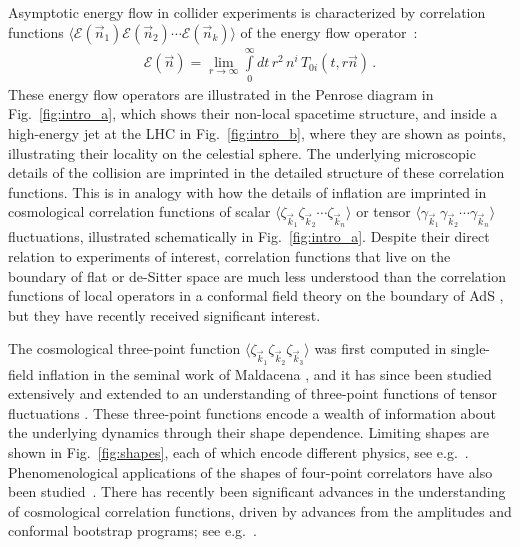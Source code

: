 \documentclass[letterpaper,11pt]{article}
\def\Fig#1{Fig.~{\ref{#1}}}
\def\to{\rightarrow}
\DeclareRobustCommand{\Fig}[1]{Fig.~\ref{#1}}
\begin{document}
Asymptotic energy flow in collider experiments is characterized by correlation functions
$\langle \mathcal{E}(\vec n_1) \mathcal{E}(\vec n_2) \cdots \mathcal{E}(\vec n_k) \rangle$ of the energy flow operator~\cite{Sveshnikov:1995vi,Tkachov:1995kk,Korchemsky:1999kt,Bauer:2008dt,Hofman:2008ar,Belitsky:2013xxa,Belitsky:2013bja,Kravchuk:2018htv}:
%
\begin{align}
\label{energy_flow_operator}
\mathcal{E}(\vec n) = \lim_{r\to \infty} \int\limits_0^\infty dt \, r^2 \, n^i \, T_{0i}(t,r \vec n)\,.
\end{align}
%
These energy flow operators are illustrated in the Penrose diagram in \Fig{fig:intro_a}, which shows their non-local spacetime structure, and inside a high-energy jet at the LHC in \Fig{fig:intro_b}, where they are shown as points, illustrating their locality on the celestial sphere.
%
The underlying microscopic details of the collision are imprinted in the detailed structure of these correlation functions.
%
This is in analogy with how the details of inflation are imprinted in cosmological correlation functions of scalar $\langle \zeta_{\vec k_1}  \zeta_{\vec k_2} \cdots  \zeta_{\vec k_n} \rangle $ or tensor $\langle \gamma_{\vec k_1}  \gamma_{\vec k_2} \cdots   \gamma_{\vec k_n} \rangle$ fluctuations, illustrated schematically in \Fig{fig:intro_a}.
%
Despite their direct relation to experiments of interest, correlation functions that live on the boundary of flat or de-Sitter space are much less understood than the correlation functions of local operators in a conformal field theory on the boundary of AdS \cite{Maldacena:1997re,Gubser:1998bc,Witten:1998qj}, but they have recently received significant interest.


The cosmological three-point function  $\langle \zeta_{\vec k_1}  \zeta_{\vec k_2}  \zeta_{\vec k_3} \rangle $ was first computed in single-field inflation in the seminal work of Maldacena \cite{Maldacena:2011nz}, and it has since been studied extensively \cite{Babich:2004gb,Chen:2006nt,Cheung:2007sv,Cheung:2007st,Weinberg:2008hq} and extended to an understanding of three-point functions of tensor fluctuations \cite{Maldacena:2011nz}. 
%
These three-point functions encode a wealth of information about the underlying dynamics through their shape dependence.
%
Limiting shapes are shown in \Fig{fig:shapes}, each of which encode different physics, see e.g.~\cite{Bartolo:2004if,Babich:2004gb,Chen:2006nt,Baumann:2009ds,Chen:2010xka,Meerburg:2019qqi,Planck:2015zfm,Planck:2019kim}.
%
Phenomenological applications of the shapes of four-point correlators have also been studied~\cite{Arroja:2009pd,Chen:2009bc,Hindmarsh:2009es,Senatore:2010jy,Bartolo:2010di,Lewis:2011au}.
%
There has recently been significant advances in the understanding of cosmological correlation functions, driven by advances from the amplitudes and conformal bootstrap programs; see e.g.~\cite{DiPietro:2021sjt,Cabass:2021fnw,Goodhew:2021oqg,Melville:2021lst,Benincasa:2020aoj,Arkani-Hamed:2018bjr,Arkani-Hamed:2017fdk,Baumann:2021fxj,Baumann:2020dch,Baumann:2019oyu,Arkani-Hamed:2018kmz,Lee:2016vti}.
\end{document}

